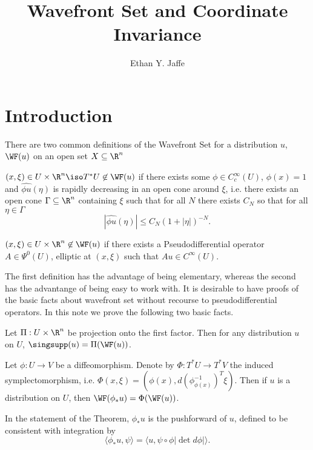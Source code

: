 \documentclass[12pt]{article}
\title{Wavefront Set and Coordinate Invariance}
\author{Ethan Y. Jaffe}
\date{}
\begin{document}
\maketitle

\section{Introduction}There are two common definitions of the Wavefront Set for a distribution $u$, $\WF(u)$ on an open set $X \subseteq \R^n$
\begin{defn}[Definition 1]$(x,\xi) \in U\times\R^n \iso T^{\ast}U \not \in \WF(u)$ if there exists some $\phi \in C_c^\infty(U)$, $\phi(x) = 1$ and $\widehat{\phi u}(\eta)$ is rapidly decreasing in an open cone around $\xi$, i.e. there exists an open cone $\Gamma \subseteq \R^n$ containing $\xi$ such that for all $N$ there exists $C_N$ so that for all $\eta \in \Gamma$
\[|\widehat{\phi u}(\eta)| \leq C_N(1+|\eta|)^{-N}.\]
\end{defn}

\begin{defn}[Definition 2]$(x,\xi) \in U\times \R^n \not \in \WF(u)$ if there exists a Pseudodifferential operator $A \in \Psi^0(U)$, elliptic at $(x,\xi)$ such that $Au \in C^\infty(U)$.\end{defn}

The first definition has the advantage of being elementary, whereas the second has the advantange of being easy to work with. It is desirable to have proofs of the basic facts about wavefront set without recourse to pseudodifferential operators. In this note we prove the following two basic facts.

\begin{prop}\label{propone}Let $\Pi:U\times\R^n$ be projection onto the first factor. Then for any distribution $u$ on $U$, $\singsupp(u) = \Pi(\WF(u))$.\end{prop}

\begin{thm}\label{thmtwo}Let $\phi:U \to V$ be a diffeomorphism. Denote by $\Phi:T^{\ast}U \to T^{\ast}V$ the induced symplectomorphism, i.e. $\Phi(x,\xi) = (\phi(x), d(\phi^{-1}_{\phi(x)})^T\xi)$. Then if $u$ is a distribution on $U$, then $\WF(\phi_{\ast}u) = \Phi(\WF(u))$.\end{thm}
In the statement of the Theorem, $\phi_{\ast}u$ is the pushforward of $u$, defined to be consistent with integration by
\[\langle \phi_{\ast}u,\psi\rangle = \langle u,\psi\circ \phi |\det d\phi|\rangle.\]
\end{document}
